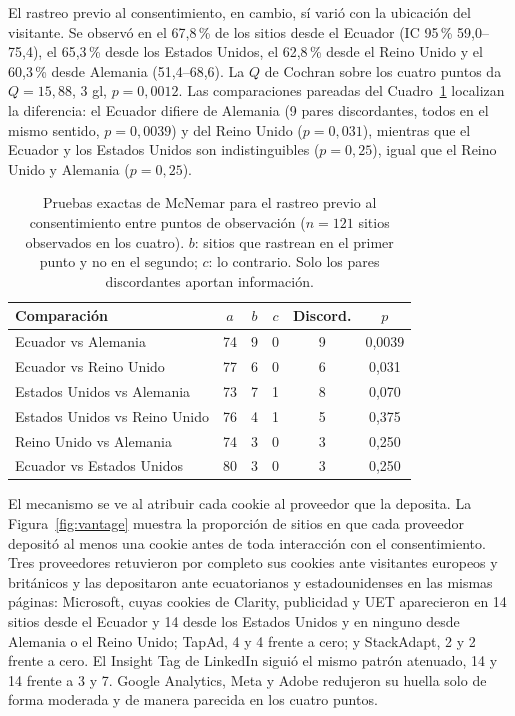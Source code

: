 \documentclass[pdflatex,sn-basic,Numbered]{sn-jnl}
\theoremstyle{thmstyleone}
\theoremstyle{thmstyletwo}
\theoremstyle{thmstylethree}
\begin{document}
El rastreo previo al consentimiento, en cambio, s\'i vari\'o con la ubicaci\'on del visitante. Se observ\'o en el 67,8\,\% de los sitios desde el Ecuador (IC 95\,\% 59,0--75,4), el 65,3\,\% desde los Estados Unidos, el 62,8\,\% desde el Reino Unido y el 60,3\,\% desde Alemania (51,4--68,6). La $Q$ de Cochran sobre los cuatro puntos da $Q=15{,}88$, 3 gl, $p=0{,}0012$. Las comparaciones pareadas del Cuadro~\ref{tab:vantage} localizan la diferencia: el Ecuador difiere de Alemania (9 pares discordantes, todos en el mismo sentido, $p=0{,}0039$) y del Reino Unido ($p=0{,}031$), mientras que el Ecuador y los Estados Unidos son indistinguibles ($p=0{,}25$), igual que el Reino Unido y Alemania ($p=0{,}25$).

\begin{table}[htbp]
	\centering
	\caption{Pruebas exactas de McNemar para el rastreo previo al consentimiento entre puntos de observaci\'on ($n=121$ sitios observados en los cuatro). $b$: sitios que rastrean en el primer punto y no en el segundo; $c$: lo contrario. Solo los pares discordantes aportan informaci\'on.}\label{tab:vantage}
	\small
	\begin{tabular}{@{}lccccc@{}}
		\toprule
		\textbf{Comparaci\'on} & $a$ & $b$ & $c$ & \textbf{Discord.} & \textbf{$p$} \\
		\midrule
		Ecuador vs Alemania & 74 & 9 & 0 & 9 & 0,0039 \\
		Ecuador vs Reino Unido & 77 & 6 & 0 & 6 & 0,031 \\
		Estados Unidos vs Alemania & 73 & 7 & 1 & 8 & 0,070 \\
		Estados Unidos vs Reino Unido & 76 & 4 & 1 & 5 & 0,375 \\
		Reino Unido vs Alemania & 74 & 3 & 0 & 3 & 0,250 \\
		Ecuador vs Estados Unidos & 80 & 3 & 0 & 3 & 0,250 \\
		\bottomrule
	\end{tabular}
\end{table}

El mecanismo se ve al atribuir cada cookie al proveedor que la deposita. La Figura~\ref{fig:vantage} muestra la proporci\'on de sitios en que cada proveedor deposit\'o al menos una cookie antes de toda interacci\'on con el consentimiento. Tres proveedores retuvieron por completo sus cookies ante visitantes europeos y brit\'anicos y las depositaron ante ecuatorianos y estadounidenses en las mismas p\'aginas: Microsoft, cuyas cookies de Clarity, publicidad y UET aparecieron en 14 sitios desde el Ecuador y 14 desde los Estados Unidos y en ninguno desde Alemania o el Reino Unido; TapAd, 4 y 4 frente a cero; y StackAdapt, 2 y 2 frente a cero. El Insight Tag de LinkedIn sigui\'o el mismo patr\'on atenuado, 14 y 14 frente a 3 y 7. Google Analytics, Meta y Adobe redujeron su huella solo de forma moderada y de manera parecida en los cuatro puntos.
\end{document}
